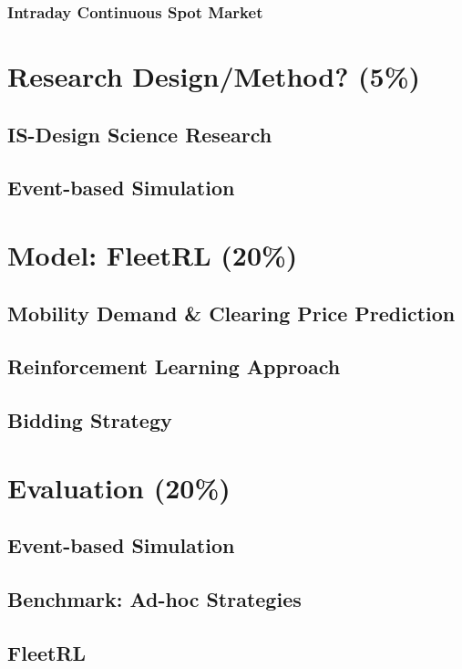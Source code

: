 \documentclass[12pt, article]{article}
\begin{document}
\subsubsection{Intraday Continuous Spot Market}
\label{sec:org2fde2cc}

\section{Research Design/Method? (5\%)}
\label{sec:orgbe8ea59}
\subsection{IS-Design Science Research}
\label{sec:orga2fca89}
\subsection{Event-based Simulation}
\label{sec:org59cb168}

\section{Model: FleetRL (20\%)}
\label{sec:org3044378}
\subsection{Mobility Demand \& Clearing Price Prediction}
\label{sec:orga579d02}
\subsection{Reinforcement Learning Approach}
\label{sec:org3965d05}
\subsection{Bidding Strategy}
\label{sec:orgcde3a49}

\section{Evaluation (20\%)}
\label{sec:org357e891}
\subsection{Event-based Simulation}
\label{sec:org13e5f02}
\subsection{Benchmark: Ad-hoc Strategies}
\label{sec:orgb8a7c62}
\subsection{FleetRL}
\label{sec:org6e699c5}
\end{document}
